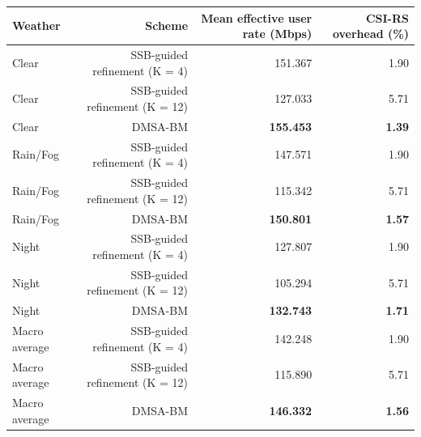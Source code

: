 \begin{tabular}{lrrr}
\toprule
Weather & Scheme & Mean effective user rate (Mbps) & CSI-RS overhead (\%) \\
\midrule
Clear & SSB-guided refinement (K = 4) & 151.367 & 1.90 \\
Clear & SSB-guided refinement (K = 12) & 127.033 & 5.71 \\
Clear & DMSA-BM & \textbf{155.453} & \textbf{1.39} \\
Rain/Fog & SSB-guided refinement (K = 4) & 147.571 & 1.90 \\
Rain/Fog & SSB-guided refinement (K = 12) & 115.342 & 5.71 \\
Rain/Fog & DMSA-BM & \textbf{150.801} & \textbf{1.57} \\
Night & SSB-guided refinement (K = 4) & 127.807 & 1.90 \\
Night & SSB-guided refinement (K = 12) & 105.294 & 5.71 \\
Night & DMSA-BM & \textbf{132.743} & \textbf{1.71} \\
Macro average & SSB-guided refinement (K = 4) & 142.248 & 1.90 \\
Macro average & SSB-guided refinement (K = 12) & 115.890 & 5.71 \\
Macro average & DMSA-BM & \textbf{146.332} & \textbf{1.56} \\
\bottomrule
\end{tabular}
